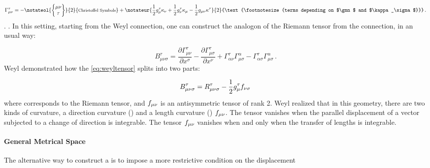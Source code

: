 \documentclass[submitted]{article}
\newcommand{\texts}[1]{\text{\footnotesize{#1}}}
\newcommand{\faradaymn}{\ensuremath{f\mn}}
\newcommand{\faraday}{\ensuremath{f}}
\begin{document}
\begin{equation}\label{eq:weylconnection}
\Gtmn=-\notateol{\christoffel{\mu}{\nu}{\tau}}{2}{\texts{Christoffel Symbols}}+\notateur{\frac{1}{2} g_{\mu}^{\tau} \kappa_{\nu}+\frac{1}{2} g_{\nu}^{\tau} \kappa_{\mu}-\frac{1}{2} \gmn \kappa^{\tau}}{2}{\texts{terms depending on $\gmn$ and $\kappa_\sigma$}} \,.
\end{equation}
%
. . In this setting, starting from the Weyl connection, one can construct the analogon of the Riemann tensor from the connection, in an usual way:
 
\begin{equation}\label{eq:weyltensor} 
B_{\mu \nu \sigma}^{\tau} =\frac{\partial \Gamma_{\mu \nu}^{\tau}}{\partial x^{\sigma}}-\frac{\partial \Gamma_{\mu \sigma}^{\tau}}{\partial x^{\nu}}+\Gamma_{\alpha \nu}^{\tau} \Gamma_{\mu \sigma}^{\alpha}-\Gamma_{\alpha \sigma}^{\tau} \Gamma_{\mu \sigma}^{\alpha}\,.
\end{equation}
%
Weyl demonstrated how the \cref{eq:weyltensor} splits into two parts:

\begin{equation*}
B_{\mu \nu \sigma}^{\tau} = \rite - \frac{1}{2} g^\tau_\mu \faraday_{\nu\sigma}\,
\end{equation*}
%
where \rite corresponds to the Riemann tensor, and $\faradaymn$ is an antisymmetric tensor of rank 2. Weyl realized that in this geometry, there are two kinds of curvature, a direction curvature () \rite and a length curvature () $\faradaymn$. The tensor \rite vanishes when the parallel displacement of a vector subjected to a change of direction is integrable. The tensor $\faradaymn$ vanishes when and only when the transfer of lengths is integrable.


\paragraph{General Metrical Space} The alternative way to construct a  is to impose a more restrictive condition on the displacement
\end{document}
